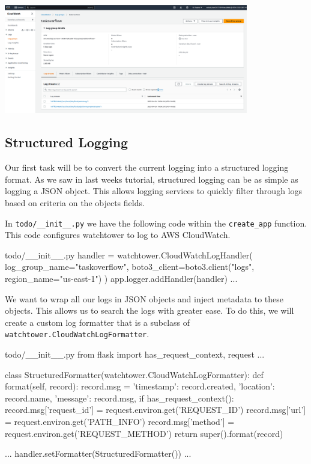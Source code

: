 \documentclass{csse4400}
\begin{document}
\begin{center}
\includegraphics[width=0.8\textwidth]{images/log-group}
\end{center}

\subsection{Structured Logging}

Our first task will be to convert the current logging into a structured logging format.
As we saw in last weeks tutorial, structured logging can be as simple as logging a JSON object.
This allows logging services to quickly filter through logs based on criteria on the objects fields.

In \texttt{todo/\_\_init\_\_.py} we have the following code within the \texttt{create\_app} function.
This code configures watchtower to log to AWS CloudWatch.

\begin{code}[language=python,numbers=none]{todo/\_\_init\_\_.py}
handler = watchtower.CloudWatchLogHandler(
    log_group_name="taskoverflow",
    boto3_client=boto3.client("logs", region_name="us-east-1")
)
app.logger.addHandler(handler)
...
\end{code}

We want to wrap all our logs in JSON objects and inject metadata to these objects.
This allows us to search the logs with greater ease.
To do this,
we will create a custom log formatter that is a subclass of \texttt{watchtower.CloudWatchLogFormatter}.

\begin{code}[language=python,numbers=none]{todo/\_\_init\_\_.py}
from flask import has_request_context, request
...

class StructuredFormatter(watchtower.CloudWatchLogFormatter):
    def format(self, record):
        record.msg = {
            'timestamp': record.created,
            'location': record.name,
            'message': record.msg,
        }
        if has_request_context():
            record.msg['request_id'] = request.environ.get('REQUEST_ID')
            record.msg['url'] = request.environ.get('PATH_INFO')
            record.msg['method'] = request.environ.get('REQUEST_METHOD')
        return super().format(record)

...
handler.setFormatter(StructuredFormatter())
...
\end{code}
\end{document}
